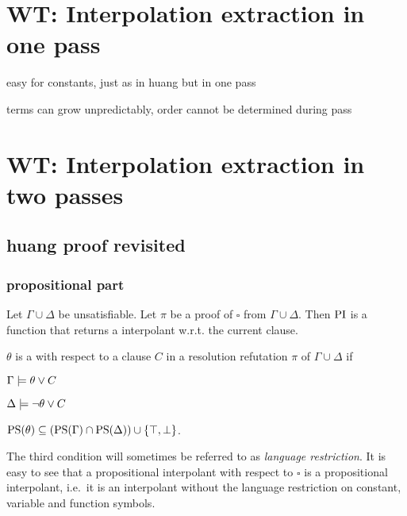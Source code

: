 
\section{WT: Interpolation extraction in one pass}

easy for constants, just as in huang but in one pass

terms can grow unpredictably, order cannot be determined during pass

\section{WT: Interpolation extraction in two passes}

\subsection{huang proof revisited}

\subsubsection{propositional part}

Let $\Gamma \cup \Delta$ be unsatisfiable. Let $\pi$ be a proof of $\square$ from $\Gamma \cup \Delta$. Then $\operatorname{PI}$ is a function that returns a interpolant w.r.t. the current clause. 

\begin{defi}
	$\theta$ is a  with respect to a clause $C$ in a resolution refutation $\pi$ of $\Gamma \cup \Delta$ if 
	\label{def:rel_prop_interpol}
	\begin{compactenum}
		\item $\Gamma \models \theta \lor C$
			\label{rel_prop_interpol_cond1}
		\item $\Delta \models \lnot \theta \lor C$
			\label{rel_prop_interpol_cond2}
		\item $\operatorname{PS}(\theta) \subseteq (\operatorname{PS}(\Gamma) \cap \operatorname{PS}(\Delta)) \cup \{\top, \bot\} $.
			\label{rel_prop_interpol_cond_lang}
			\qedhere
	\end{compactenum}
\end{defi}

The third condition will sometimes be referred to as \emph{language restriction}.
It is easy to see that a propositional interpolant with respect to $\square$ is a propositional interpolant, i.e.~it is an interpolant without the language restriction on constant, variable and function symbols.


